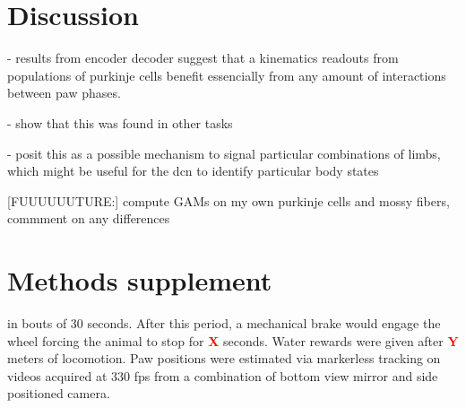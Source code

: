 
\section{Discussion}

- results from encoder decoder suggest that a kinematics readouts from populations of purkinje cells benefit essencially from any amount of interactions between paw phases.

- show that this was found in other tasks

- posit this as a possible mechanism to signal particular combinations of limbs, which might be useful for the dcn to identify particular body states

[FUUUUUUTURE:] compute GAMs on my own purkinje cells and mossy fibers, commment on any differences

\section{Methods supplement}
% 

in bouts of 30 seconds. After this period, a mechanical brake would engage the wheel forcing the animal to stop for \textbf{\textcolor{red}{X}} seconds. Water rewards were given after \textbf{\textcolor{red}{Y}} meters of locomotion. Paw positions were estimated via markerless tracking on videos acquired at 330 fps from a combination of bottom view mirror and side positioned camera.

